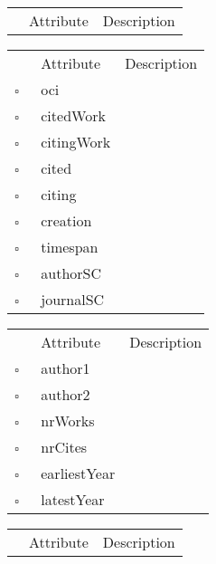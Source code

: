\begin{table}
\caption{Book  }

\begin{longtable}{llp{8cm}}
& Attribute & Description \\
\end{longtable}
\label{attr:Book}
\end{table}

\begin{table}
\caption{Citation  }

\begin{longtable}{llp{8cm}}
& Attribute & Description \\
$\square$\ & oci &  \\
$\square$\ & citedWork &  \\
$\square$\ & citingWork &  \\
$\square$\ & cited &  \\
$\square$\ & citing &  \\
$\square$\ & creation &  \\
$\square$\ & timespan &  \\
$\square$\ & authorSC &  \\
$\square$\ & journalSC &  \\
\end{longtable}
\label{attr:Citation}
\end{table}

\clearpage
\begin{table}
\caption{Coauthor  }

\begin{longtable}{llp{8cm}}
& Attribute & Description \\
$\square$\ & author1 &  \\
$\square$\ & author2 &  \\
$\square$\ & nrWorks &  \\
$\square$\ & nrCites &  \\
$\square$\ & earliestYear &  \\
$\square$\ & latestYear &  \\
\end{longtable}
\label{attr:Coauthor}
\end{table}

\begin{table}
\caption{Collection  }

\begin{longtable}{llp{8cm}}
& Attribute & Description \\
\end{longtable}
\label{attr:Collection}
\end{table}


